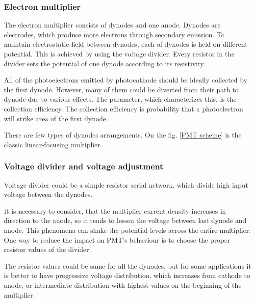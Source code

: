 \subsubsection{Electron multiplier}
The electron multiplier consists of dynodes and one anode.
Dynodes are electrodes, which produce more electrons through secondary emission. To maintain electrostatic field between dynodes, each of dynodes is held on different potential. This is achieved by using the voltage divider. Every resistor in the divider sets the potential of one dynode according to its resistivity.
\par
All of the photoelectrons emitted by photocathode should be ideally collected by the first dynode. However, many of them could be diverted from their path to dynode due to various effects. The parameter, which characterizes this, is the collection efficiency. The collection efficiency is probability that a photoelectron will strike area of the first dynode. 
\par
There are few types of dynodes arrangements. On the fig. \ref{PMT scheme} is the classic linear-focusing multiplier. 


\subsubsection{Voltage divider and voltage adjustment}
Voltage divider could be a simple resistor serial network, which divide high input voltage between the dynodes. 
\par
It is necessary to consider, that the multiplier current density increases in direction to the anode, so it tends to lessen the voltage between last dynode and anode. This phenomena can shake the potential levels across the entire multiplier. One way to reduce the impact on PMT's behaviour is to choose the proper resistor values of the divider. 
\par
The resistor values could be same for all the dynodes, but for some applications it is better to have progressive voltage distribution, which increases from cathode to anode, or intermediate distribution with highest values on the beginning of the multiplier.

